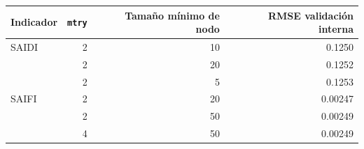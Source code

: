 \begin{tabular}{l r r r}
\toprule
\textbf{Indicador} & \textbf{\texttt{mtry}} & \textbf{Tamaño mínimo de nodo} & \textbf{RMSE validación interna} \\
\midrule
SAIDI & 2 & 10 & 0.1250 \\
 & 2 & 20 & 0.1252 \\
 & 2 & 5 & 0.1253 \\
\addlinespace
SAIFI & 2 & 20 & 0.00247 \\
 & 2 & 50 & 0.00249 \\
 & 4 & 50 & 0.00249 \\
\bottomrule
\end{tabular}
